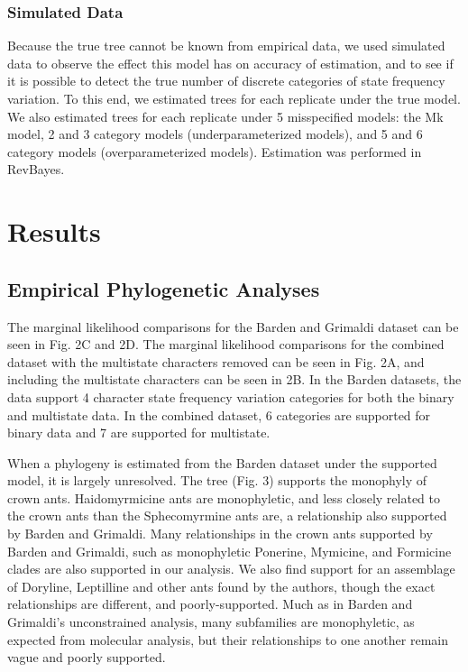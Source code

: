 \documentclass[]{sysbio}
\begin{document}
\subsubsection{Simulated Data}

Because the true tree cannot be known from empirical data, we used simulated data to observe the effect this model has on accuracy of estimation, and to see if it is possible to detect the true number of discrete categories of state frequency variation.
To this end, we estimated trees for each replicate under the true model.
We also estimated trees for each replicate under 5 misspecified models: the Mk model, 2 and 3 category models (underparameterized models), and 5 and 6 category models (overparameterized models). 
Estimation was performed in RevBayes.\par


\section{Results}

\subsection{Empirical Phylogenetic Analyses}

The marginal likelihood comparisons for the Barden and Grimaldi dataset can be seen in Fig. 2C and 2D.
The marginal likelihood comparisons for the combined dataset with the multistate characters removed can be seen in Fig. 2A, and including the multistate characters can be seen in 2B.
In the Barden datasets, the data support 4 character state frequency variation categories for both the binary and multistate data.
In the combined dataset, 6 categories are supported for binary data and 7 are supported for multistate. \par
When a phylogeny is estimated from the Barden dataset under the supported model, it is largely unresolved. 
The tree (Fig. 3) supports the monophyly of crown ants. 
Haidomyrmicine ants are monophyletic, and less closely related to the crown ants than the Sphecomyrmine ants are, a relationship also supported by Barden and Grimaldi. 
Many relationships in the crown ants supported by Barden and Grimaldi, such as monophyletic Ponerine, Mymicine, and Formicine clades are also supported in our analysis.  
We also find support for an assemblage of Doryline, Leptilline and other ants found by the authors, though the exact relationships are different, and poorly-supported. 
Much as in Barden and Grimaldi's unconstrained analysis, many subfamilies are monophyletic, as expected from molecular analysis, but their relationships to one another remain vague and poorly supported. 
\par
\end{document}

